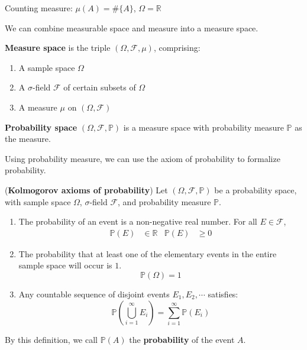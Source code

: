 \documentclass{huhtakm-template-book}
\newcommand{\prob}{\mathbb{P}}
\begin{document}
\begin{eg}
	Counting measure: $\mu(A)=\#\{A\}$, $\Omega=\mathbb{R}$
\end{eg}
We can combine measurable space and measure into a measure space.
\begin{defn}
	\textbf{Measure space} is the triple $(\Omega,\mathcal{F},\mu)$, comprising:
	\begin{enumerate}
		\item A sample space $\Omega$
		\item A $\sigma$-field $\mathcal{F}$ of certain subsets of $\Omega$
		\item A measure $\mu$ on $(\Omega,\mathcal{F})$
	\end{enumerate}
	\textbf{Probability space} $(\Omega,\mathcal{F},\prob)$ is a measure space with probability measure $\prob$ as the measure.
\end{defn}
Using probability measure, we can use the axiom of probability to formalize probability.
\begin{defn}(\textbf{Kolmogorov axioms of probability})
	Let $(\Omega,\mathcal{F},\prob)$ be a probability space, with sample space $\Omega$, $\sigma$-field $\mathcal{F}$, and probability measure $\prob$.
	\begin{enumerate}
		\item The probability of an event is a non-negative real number. For all $E\in\mathcal{F}$,
		\begin{align*}
			\prob(E)&\in\mathbb{R} & \prob(E)&\geq 0
		\end{align*}
		\item The probability that at least one of the elementary events in the entire sample space will occur is $1$.
		\begin{equation*}
			\prob(\Omega)=1
		\end{equation*}
		\item Any countable sequence of disjoint events $E_{1},E_{2},\cdots$ satisfies:
		\begin{equation*}
			\prob\left(\bigcup_{i=1}^{\infty}E_{i}\right)=\sum_{i=1}^{\infty}\prob(E_{i})
		\end{equation*}
	\end{enumerate}
	By this definition, we call $\prob(A)$ the \textbf{probability} of the event $A$.
\end{defn}
\end{document}

